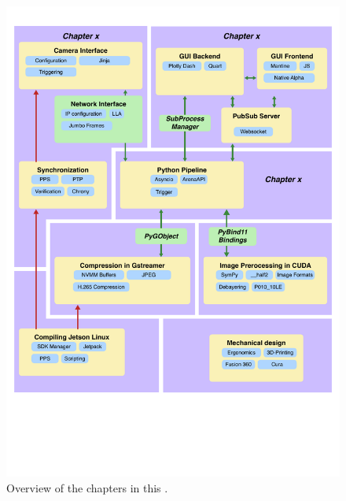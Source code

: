 \begin{figure}[H]
    \includegraphics[width=\textwidth]{chapters/10_intro/chapter_overview.pdf}
    \caption{Overview of the chapters in this \master.}
\end{figure}
